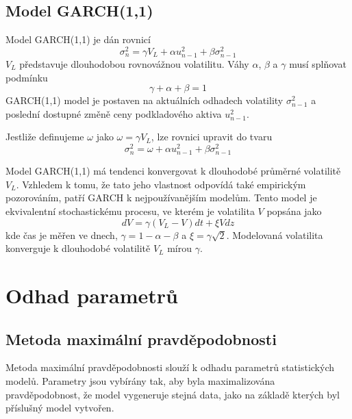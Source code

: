 \documentclass[a4paper]{book}
\begin{document}
\subsection{Model GARCH(1,1)}
Model GARCH(1,1) je dán rovnicí
\begin{equation*}
\sigma_n^2 = \gamma V_L + \alpha u_{n-1}^2 + \beta \sigma_{n-1}^2
\end{equation*}
$V_L$ představuje dlouhodobou rovnovážnou volatilitu. Váhy $\alpha$, $\beta$ a $\gamma$ musí splňovat podmínku
\begin{equation*}
\gamma + \alpha + \beta = 1
\end{equation*}
GARCH(1,1) model je postaven na aktuálních odhadech volatility $\sigma_{n-1}^2$ a poslední dostupné změně ceny podkladového aktiva $u_{n-1}^2$.

Jestliže definujeme $\omega$ jako $\omega = \gamma V_L$, lze rovnici upravit do tvaru
\begin{equation}
\sigma_n^2 = \omega + \alpha u_{n-1}^2 + \beta \sigma_{n-1}^2
\end{equation}

Model GARCH(1,1) má tendenci konvergovat k dlouhodobé průměrné volatilitě $V_L$. Vzhledem k tomu, že tato jeho vlastnost odpovídá také empirickým pozorováním, patří GARCH k nejpoužívanějším modelům. Tento model je ekvivalentní stochastickému procesu, ve kterém je  volatilita $V$ popsána jako
\begin{equation*}
dV = \gamma(V_L - V)dt + \xi Vdz
\end{equation*}
kde čas je měřen ve dnech, $\gamma = 1 - \alpha - \beta$ a $\xi = \gamma \sqrt{2}$. Modelovaná volatilita konverguje k dlouhodobé volatilitě $V_L$ mírou $\gamma$.

\section{Odhad parametrů}

\subsection{Metoda maximální pravděpodobnosti}
Metoda maximální pravděpodobnosti slouží k odhadu parametrů statistických modelů. Parametry jsou vybírány tak, aby byla maximalizována pravděpodobnost, že model vygeneruje stejná data, jako na základě kterých byl příslušný model vytvořen.
\end{document}
